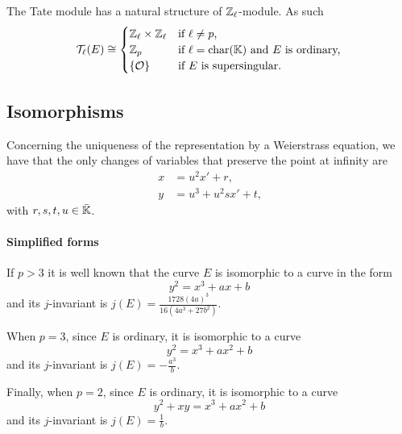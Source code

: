 \begin{proposition}
  The Tate module has a natural structure of
  $\mathbb{Z}_\ell$-module. As such
  \begin{equation}
    \label{eq:134}
    \mathcal{T}_\ell(E) \cong
    \begin{cases}
      \mathbb{Z}_\ell\times\mathbb{Z}_\ell &\text{if $\ell\ne p$,}\\
      \mathbb{Z}_p &\text{if $\ell=\operatorname{char}(\mathbb{K})$ and $E$ is ordinary,}\\
      \{\mathcal{O}\} &\text{if $E$ is supersingular.}
    \end{cases}
  \end{equation}
\end{proposition}


\subsection{Isomorphisms}
\label{sec:isomorphisms}

Concerning the uniqueness of the representation by a Weierstrass
equation, we have that the only changes of variables that preserve the
point at infinity  are
\begin{equation}
  \label{eq:116}
  \begin{aligned}
    x &= u^2x' + r\text{,}\\
    y &= u^3 + u^2sx' + t\text{,}
  \end{aligned}
\end{equation}
with $r,s,t,u\in\bar{\mathbb{K}}$.

\paragraph{Simplified forms} If $p>3$ it is well known that the curve
$E$ is isomorphic to a curve in the form
\begin{equation}
  \label{eq:weierstrass>3}
  y^2 = x^3 + ax + b
\end{equation}
and its $j$-invariant is $j(E) = \frac{1728(4a)^3}{16(4a^3 + 27b^2)}$.

When $p=3$, since $E$ is ordinary, it is isomorphic to a curve
\begin{equation}
  \label{eq:weierstrass=3}
  y^2 = x^3 + ax^2 + b
\end{equation}
and its $j$-invariant is $j(E) = -\frac{a^3}{b}$.

Finally, when $p=2$, since $E$ is ordinary, it is isomorphic to a curve
\begin{equation}
  \label{eq:weierstrass=2}
  y^2 + xy = x^3 + ax^2 + b
\end{equation}
and its $j$-invariant is $j(E) = \frac{1}{b}$.

